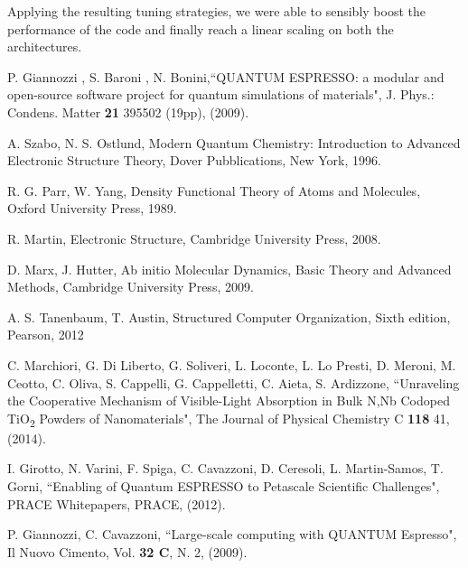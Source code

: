 \documentclass[a4paper,10pt]{article}
\begin{document}
Applying the resulting tuning strategies, we were able to sensibly boost the performance of the code and finally reach a linear scaling on both the architectures.

\begin{thebibliography}{9}


P. Giannozzi , S. Baroni , N. Bonini,``QUANTUM ESPRESSO: a modular and open-source software project for quantum simulations of materials", J. Phys.: Condens. Matter \textbf{21} 395502 (19pp), (2009).

A. Szabo, N. S. Ostlund,
Modern Quantum Chemistry: Introduction to Advanced Electronic Structure Theory,
Dover Pubblications, New York,
1996.


R. G. Parr, W. Yang,
Density Functional Theory of Atoms and Molecules,
Oxford University Press,
1989.


R. Martin, 
Electronic Structure,
Cambridge University Press,
2008.


D. Marx, J. Hutter,
Ab initio Molecular Dynamics,
Basic Theory and Advanced Methods,
Cambridge University Press,
2009.


A. S. Tanenbaum, T. Austin,
Structured Computer Organization,
Sixth edition,
Pearson,
2012


C. Marchiori, G. Di Liberto, G. Soliveri, L. Loconte, L. Lo Presti, D. Meroni, M. Ceotto, C. Oliva, S. Cappelli, G. Cappelletti, C. Aieta, S. Ardizzone,
``Unraveling the Cooperative Mechanism of Visible-Light Absorption in Bulk N,Nb Codoped TiO\textsubscript{2} Powders of Nanomaterials",
The Journal of Physical Chemistry C \textbf{118} 41, (2014).

I. Girotto, N. Varini, F. Spiga, C. Cavazzoni, D. Ceresoli, L. Martin-Samos, T. Gorni,
``Enabling of Quantum ESPRESSO to Petascale Scientific Challenges",
PRACE Whitepapers,
PRACE,
(2012).

P. Giannozzi, C. Cavazzoni,
``Large-scale computing with QUANTUM Espresso",
Il Nuovo Cimento, Vol. \textbf{32 C}, N. 2, (2009).






\end{thebibliography}
\end{document}
